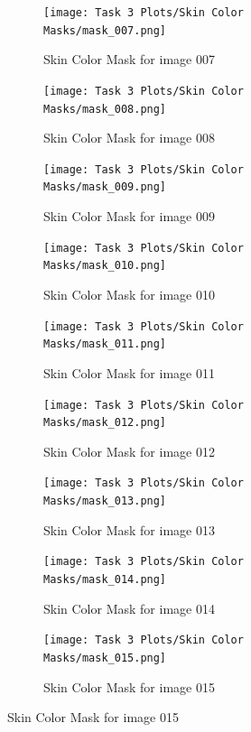 \documentclass[11pt]{report}
\begin{document}
\begin{figure}[H]
\begin{subfigure}{0.24\textwidth}
        \texttt{[image: Task 3 Plots/Skin Color Masks/mask\_007.png]}
        \caption{Skin Color Mask for image 007}
        \label{fig:kskincolormask7}
    \end{subfigure}
    \begin{subfigure}{0.24\textwidth}
        \centering
        \texttt{[image: Task 3 Plots/Skin Color Masks/mask\_008.png]}
        \caption{Skin Color Mask for image 008}
        \label{fig:kskincolormask8}
    \end{subfigure}
    \begin{subfigure}{0.24\textwidth}
        \centering
        \texttt{[image: Task 3 Plots/Skin Color Masks/mask\_009.png]}
        \caption{Skin Color Mask for image 009}
        \label{fig:kskincolormask9}
    \end{subfigure}
    \begin{subfigure}{0.24\textwidth}
        \centering
        \texttt{[image: Task 3 Plots/Skin Color Masks/mask\_010.png]}
        \caption{Skin Color Mask for image 010}
        \label{fig:kskincolormask10}
    \end{subfigure}
    \begin{subfigure}{0.24\textwidth}
        \centering
        \texttt{[image: Task 3 Plots/Skin Color Masks/mask\_011.png]}
        \caption{Skin Color Mask for image 011}
        \label{fig:kskincolormask11}
    \end{subfigure}
    \begin{subfigure}{0.24\textwidth}
        \centering
        \texttt{[image: Task 3 Plots/Skin Color Masks/mask\_012.png]}
        \caption{Skin Color Mask for image 012}
        \label{fig:kskincolormask12}
    \end{subfigure}
    \begin{subfigure}{0.24\textwidth}
        \centering
        \texttt{[image: Task 3 Plots/Skin Color Masks/mask\_013.png]}
        \caption{Skin Color Mask for image 013}
        \label{fig:kskincolormask13}
    \end{subfigure}
    \begin{subfigure}{0.24\textwidth}
        \centering
        \texttt{[image: Task 3 Plots/Skin Color Masks/mask\_014.png]}
        \caption{Skin Color Mask for image 014}
        \label{fig:kskincolormask14}
    \end{subfigure}
    \begin{subfigure}{0.24\textwidth}
        \centering
        \texttt{[image: Task 3 Plots/Skin Color Masks/mask\_015.png]}
        \caption{Skin Color Mask for image 015}

\end{subfigure}
\end{figure}
\end{document}
